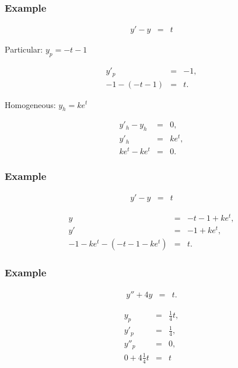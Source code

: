\begin{frame}
  \frametitle{Example}

  \begin{eqnarray*}
    y' - y & = & t
  \end{eqnarray*}

  Particular: $y_p = -t-1$

  \begin{eqnarray*}
    y'_p & = & -1, \\
    -1 - (-t -1) & = & t.
  \end{eqnarray*}

  Homogeneous: $y_h = k e^t$

  \begin{eqnarray*}
    y'_h - y_h & = & 0, \\
    y'_h & = & k e^t, \\
    k e^t - k e^t & = & 0.
  \end{eqnarray*}

\end{frame}

\begin{frame}
  \frametitle{Example}

  \begin{eqnarray*}
    y' - y & = & t
  \end{eqnarray*}

  \begin{eqnarray*}
    y & = & -t - 1 + ke^t, \\
    y' & = & -1 + ke^t, \\
    -1-ke^t - (-t-1-ke^t) & = & t.
  \end{eqnarray*}

\end{frame}


\begin{frame}
  \frametitle{Example}

  \begin{eqnarray*}
    y'' + 4y & = & t.
  \end{eqnarray*}

  \begin{eqnarray*}
    y_p & = & \frac{1}{4} t, \\
    y'_p & = & \frac{1}{4}, \\
    y''_p & = & 0, \\
    0 + 4\frac{1}{4} t & = & t
  \end{eqnarray*}
\end{frame}

